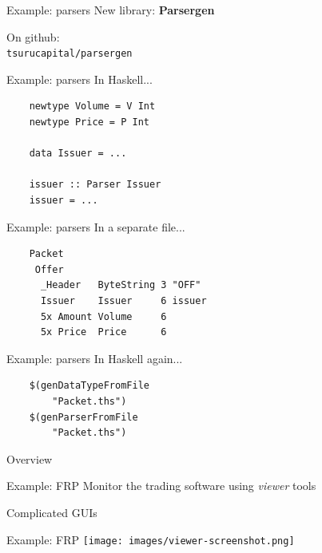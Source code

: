 \documentclass[20pt]{beamer}
\newcommand{\vspaced}{
    \vspace{5mm}
}
\begin{document}
\begin{frame}{Example: parsers}
    New library: \textbf{Parsergen} \\
    \vspaced
    On github: \\
    \texttt{tsurucapital/parsergen}
\end{frame}

\begin{frame}[fragile]{Example: parsers}
    In Haskell... \\
    \vspaced
    \begin{lstlisting}
    newtype Volume = V Int
    newtype Price = P Int

    data Issuer = ...

    issuer :: Parser Issuer
    issuer = ...
    \end{lstlisting}
\end{frame}

\begin{frame}[fragile]{Example: parsers}
    In a separate file...
    \vspaced
    \begin{lstlisting}
    Packet
     Offer
      _Header   ByteString 3 "OFF"
      Issuer    Issuer     6 issuer
      5x Amount Volume     6
      5x Price  Price      6
    \end{lstlisting}
\end{frame}

\begin{frame}[fragile]{Example: parsers}
    In Haskell again... \\
    \vspaced
    \begin{lstlisting}
    $(genDataTypeFromFile
        "Packet.ths")
    $(genParserFromFile
        "Packet.ths")
    \end{lstlisting}
\end{frame}


\begin{frame}{Overview}
\end{frame}

\begin{frame}{Example: FRP}
    Monitor the trading software using \emph{viewer} tools \\
    \vspaced
    Complicated GUIs
\end{frame}

\begin{frame}{Example: FRP}
    \texttt{[image: images/viewer-screenshot.png]}
\end{frame}
\end{document}
